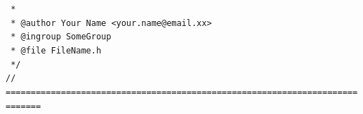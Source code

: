 \documentclass[a4paper,twoside,15pt]{book}
\begin{document}
            \verb' '{\color{highlight_c_dox_comment}\verb'*'}\\
            \verb' '{\color{highlight_c_dox_comment}\verb'*'}\verb' '{\color{highlight_c_dox_tag}\verb'@author'}{\color{highlight_c_dox_name}\verb' Your Name <your.name@email.xx>'}\\
            \verb' '{\color{highlight_c_dox_comment}\verb'*'}\verb' '{\color{highlight_c_dox_tag}\verb'@ingroup'}{\color{highlight_c_dox_name}\verb' SomeGroup'}\\
            \verb' '{\color{highlight_c_dox_comment}\verb'*'}\verb' '{\color{highlight_c_dox_tag}\verb'@file'}\verb' '{\color{highlight_c_dox_word}\verb'FileName.h'}\\
            \verb' '{\color{highlight_c_dox_comment}\verb'*/'}\\
            {\color{highlight_c_comment}\verb'// ============================================================================='}\\

        \clearpage
\end{document}
